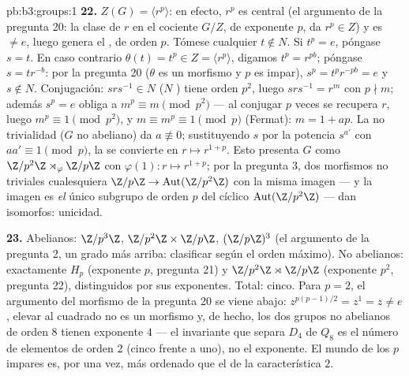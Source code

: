 \begin{solution}{pb:b3:groups:1}
\textbf{22.} $Z(G) = \langle r^p\rangle$: en efecto, $r^p$ es central
(el argumento de la pregunta 20: la clase de $r$ en el cociente $G/Z$,
de exponente $p$, da $r^p \in Z$) y es $\neq e$, luego genera el
, de orden $p$. Tómese cualquier
$t \notin N$. Si $t^p = e$, póngase $s = t$. En caso contrario
$\theta(t) = t^p \in Z =
\langle r^p\rangle$, digamos $t^p = r^{pb}$; póngase $s = tr^{-b}$: por
la pregunta 20 ($\theta$ es un morfismo y $p$ es impar), $s^p =
t^pr^{-pb} = e$ y $s \notin N$. Conjugación: $srs^{-1} \in
N$ ($N$ ) tiene orden $p^2$, luego
$srs^{-1} = r^m$ con $p
\nmid m$; además $s^p = e$ obliga a $m^p \equiv m \pmod{p^2}$ --- al
conjugar $p$ veces se recupera $r$, luego $m^p \equiv 1 \pmod
{p^2}$, y $m \equiv m^p \equiv 1 \pmod p$ (Fermat): $m = 1 +
ap$. La no trivialidad ($G$ no abeliano) da $a \not\equiv 0$;
sustituyendo $s$ por la potencia $s^{a'}$ con $aa' \equiv 1 \pmod p$, la
 se convierte en
$r \mapsto r^{1+p}$. Esto presenta $G$ como
$\Z/p^2\Z\rtimes_\varphi\Z/p\Z$ con $\varphi(1)\colon r
\mapsto r^{1+p}$; por la pregunta 3, dos morfismos no triviales
cualesquiera $\Z/p\Z \to \operatorname{Aut}(\Z/p^2\Z)$ con la misma
imagen --- y la imagen es \emph{el} único subgrupo de orden $p$ del
cíclico $\operatorname{Aut}(\Z/p^2\Z)$ --- dan
 isomorfos:
unicidad.

\textbf{23.} Abelianos: $\Z/p^3\Z$, $\Z/p^2\Z\times\Z/p\Z$, $(\Z/p\Z)^3$
(el argumento de la pregunta 2, un grado más arriba: clasificar según el
orden máximo). No abelianos: exactamente $H_p$ (exponente $p$, pregunta
21) y $\Z/p^2\Z\rtimes\Z/p\Z$ (exponente $p^2$, pregunta 22),
distinguidos por sus exponentes. Total: cinco. Para $p = 2$, el
argumento del morfismo de la pregunta 20 se viene abajo:
$z^{p(p-1)/2} = z^{1} = z \neq e$, elevar al cuadrado no es un morfismo
y, de hecho, los dos grupos no abelianos de orden $8$ tienen exponente
$4$ --- el invariante que separa $D_4$ de $Q_8$ es el número de
elementos de orden $2$ (cinco frente a uno), no el exponente. El mundo
de los $p$ impares es, por una vez, más ordenado que el de la
característica $2$.


\end{solution}
